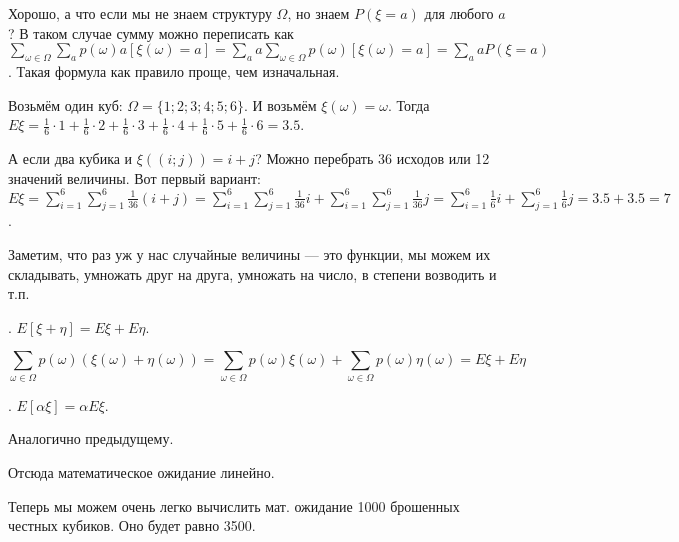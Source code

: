 \documentclass{article}
\begin{document}
\begin{itemize}
\begin{Comment}
        \end{Comment}
        \begin{Comment}
            Хорошо, а что если мы не знаем структуру $\Omega$, но знаем $P(\xi=a)$ для любого $a$? В таком случае сумму можно переписать как $\sum\limits_{\omega\in\Omega}\sum\limits_{a}p(\omega)a[\xi(\omega)=a]=\sum\limits_{a}a\sum\limits_{\omega\in\Omega}p(\omega)[\xi(\omega)=a]=\sum\limits_{a}aP(\xi=a)$. Такая формула как правило проще, чем изначальная.
        \end{Comment}
        \begin{Example}
            Возьмём один куб: $\Omega=\{1;2;3;4;5;6\}$. И возьмём $\xi(\omega)=\omega$. Тогда $E\xi=\frac16\cdot1+\frac16\cdot2+\frac16\cdot3+\frac16\cdot4+\frac16\cdot5+\frac16\cdot6=3.5$.
        \end{Example}
        \begin{Example}
            А если два кубика и $\xi((i;j))=i+j$? Можно перебрать 36 исходов или 12 значений величины. Вот первый вариант: $E\xi=\sum\limits_{i=1}^6\sum\limits_{j=1}^6\frac1{36}(i+j)=\sum\limits_{i=1}^6\sum\limits_{j=1}^6\frac1{36}i+\sum\limits_{i=1}^6\sum\limits_{j=1}^6\frac1{36}j=\sum\limits_{i=1}^6\frac16i+\sum\limits_{j=1}^6\frac16j=3.5+3.5=7$.
        \end{Example}
        \begin{Comment}
            Заметим, что раз уж у нас случайные величины --- это функции, мы можем их складывать, умножать друг на друга, умножать на число,  в степени возводить и т.п.
        \end{Comment}
        \thm {}. $E[\xi+\eta]=E\xi+E\eta$.
        \begin{Proof}
            $$\sum\limits_{\omega\in\Omega}p(\omega)(\xi(\omega)+\eta(\omega))=\sum\limits_{\omega\in\Omega}p(\omega)\xi(\omega)+\sum\limits_{\omega\in\Omega}p(\omega)\eta(\omega)=E\xi+E\eta$$
        \end{Proof}
        \thm {}. $E[\alpha \xi]=\alpha E\xi$.
        \begin{Proof}
            Аналогично предыдущему.
        \end{Proof}
        \thm Отсюда математическое ожидание линейно.
        \begin{Comment}
            Теперь мы можем очень легко вычислить мат. ожидание 1000 брошенных честных кубиков. Оно будет равно 3500.
        \end{Comment}

\end{itemize}
\end{document}
